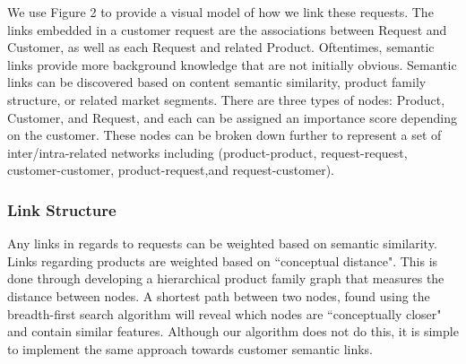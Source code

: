 \documentclass[sigconf]{acmart}
\begin{document}
We use Figure 2 to provide a visual model of how we link these requests. The links embedded in a customer request are the associations between Request and Customer, as well as each Request and related Product. Oftentimes, semantic links provide more background knowledge that are not initially obvious. Semantic links can be discovered based on content semantic similarity, product family structure, or related market segments. There are three types of nodes: Product, Customer, and Request, and each can be assigned an importance score depending on the customer. These nodes can be broken down further to represent a set of inter/intra-related networks including (product-product, request-request, customer-customer, product-request,and request-customer).

\subsubsection{Link Structure}
Any links in regards to requests can be weighted based on semantic similarity. Links regarding products are weighted based on ``conceptual distance". This is done through developing a hierarchical product family graph that measures the distance between nodes. A shortest path between two nodes, found using the breadth-first search algorithm will reveal which nodes are ``conceptually closer" and contain similar features. Although our algorithm does not do this, it is simple to implement the same approach towards customer semantic links.  
\end{document}
